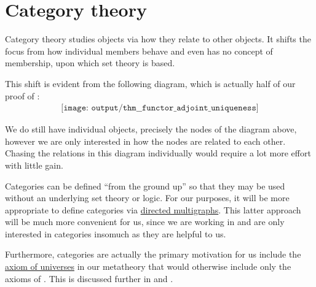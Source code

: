 \chapter{Category theory}\label{ch:category_theory}

Category theory studies objects via how they relate to other objects. It shifts the focus from how individual members behave and even has no concept of membership, upon which set theory is based.

This shift is evident from the following diagram, which is actually half of our proof of :
\begin{equation*}
  \begin{aligned}
    \texttt{[image: output/thm\_\_functor\_adjoint\_uniqueness]}
  \end{aligned}
\end{equation*}

We do still have individual objects, precisely the nodes of the diagram above, however we are only interested in how the nodes are related to each other. Chasing the relations in this diagram individually would require a lot more effort with little gain.

Categories can be defined \enquote{from the ground up} so that they may be used without an underlying set theory or logic. For our purposes, it will be more appropriate to define categories via \hyperref[def:directed_multigraph]{directed multigraphs}. This latter approach will be much more convenient for us, since we are working in \hyperref[def:axiom_of_universes]{} and are only interested in categories insomuch as they are helpful to us.

Furthermore, categories are actually the primary motivation for us include the \hyperref[def:axiom_of_universes]{axiom of universes} in our metatheory that would otherwise include only the axioms of \hyperref[def:zfc]{}. This is discussed further in  and .
